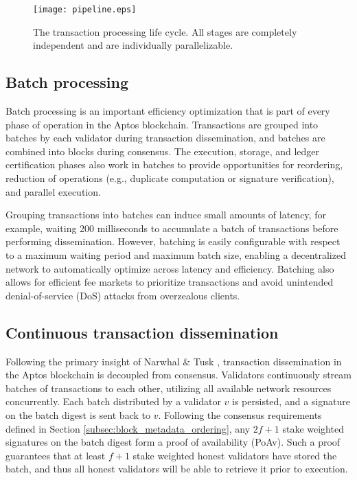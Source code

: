 \documentclass{article}
\begin{document}
\begin{figure}
\centering
\texttt{[image: pipeline.eps]}
\caption{\label{fig:pipeline}The transaction processing life cycle. All stages are completely independent and are individually parallelizable.}
\end{figure}

\subsection{Batch processing}

Batch processing is an important efficiency optimization that is part of every phase of operation in the Aptos blockchain. Transactions are grouped into batches by each validator during transaction dissemination, and batches are combined into blocks during consensus. The execution, storage, and ledger certification phases also work in batches to provide opportunities for reordering, reduction of operations (e.g., duplicate computation or signature verification), and parallel execution.

Grouping transactions into batches can induce small amounts of latency, for example, waiting 200 milliseconds to accumulate a batch of transactions before performing dissemination. However, batching is easily configurable with respect to a maximum waiting period and maximum batch size, enabling a decentralized network to automatically optimize across latency and efficiency. Batching also allows for efficient fee markets to prioritize transactions and avoid unintended denial-of-service (DoS) attacks from overzealous clients.

\subsection{Continuous transaction dissemination}
\label{continuous_txn_dissemination}

Following the primary insight of Narwhal \& Tusk \cite{narwhal_tusk}, transaction dissemination in the Aptos blockchain is decoupled from consensus. Validators continuously stream batches of transactions to each other, utilizing all available network resources concurrently. Each batch distributed by a validator $v$ is persisted, and a signature on the batch digest is sent back to $v$. Following the consensus requirements defined in Section \ref{subsec:block_metadata_ordering}, any $2f+1$ stake weighted signatures on the batch digest form a proof of availability (PoAv). Such a proof guarantees that at least $f+1$ stake weighted honest validators have stored the batch, and thus all honest validators will be able to retrieve it prior to execution. 
\end{document}
